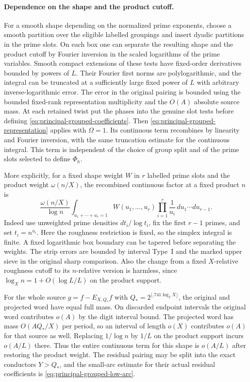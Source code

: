 \documentclass[11pt,a4paper]{article}
\theoremstyle{paperplain}
\numberwithin{equation}{section}
\begin{document}
\paragraph{Dependence on the shape and the product cutoff.}
For a smooth shape depending on the normalized prime exponents,
choose a smooth partition over the eligible labelled groupings and
insert dyadic partitions in the prime slots. On each box one can
separate the resulting shape and the product cutoff by Fourier
inversion in the scaled logarithms of the prime variables. Smooth
compact extensions of these tests have fixed-order derivatives
bounded by powers of $L$. Their Fourier first norms are
polylogarithmic, and the integral can be truncated at a sufficiently
large fixed power of $L$ with arbitrary inverse-logarithmic error.
The error in the original pairing is bounded using the bounded
fixed-rank representation multiplicity and the $O(A)$ absolute
source mass. At each retained twist put the phases into the genuine
slot tests before defining \eqref{eq:principal-grouped-coefficients}.
Then \eqref{eq:principal-grouped-representation} applies with
$\Omega=1$. Its continuous term recombines by linearity and Fourier
inversion, with the same truncation estimate for the continuous
integral. This term is independent of the choice of group split
and of the prime slots selected to define $\Phi_h$.

More explicitly, for a fixed shape weight $W$ in $r$ labelled
prime slots and the product weight $\omega(n/X)$, the recombined
continuous factor at a fixed product $n$ is
\[
 \frac{\omega(n/X)}{\log n}
    \int_{u_1+\cdots+u_r=1} W(u_1,\ldots,u_r)
                        \prod_{i=1}^r\frac1{u_i}\,du_1\cdots du_{r-1}.
\]
Indeed use unweighted prime densities $dt_i/\log t_i$, fix the
first $r-1$ primes, and set $t_i=n^{u_i}$. Here the roughness
restriction is fixed, so the simplex integral is finite. A fixed
logarithmic box boundary can be tapered before separating the
weights. The strip errors are bounded by interval Type~I and the
marked upper sieve in the original sharp comparison. Also the
change from a fixed $X$-relative roughness cutoff to its
$n$-relative version is harmless, since $\log_X n=1+O(\log L/L)$
on the product support.

For the whole source $g=f-E_{X,Q_*}f$ with
$Q_*=2^{\lfloor .741\log_2 X\rfloor}$, the original and projected
word have equal full mass. On discarded endpoint intervals the
original word contributes $o(A)$ by the digit interval bound.
The projected word has mass $O(AQ_*/X)$ per period, so an interval
of length $o(X)$ contributes $o(A)$ for that source as well.
Replacing $1/\log n$ by $1/L$ on the product support incurs
$o(A/L)$ there. Thus the entire continuous term for this shape
is $o(A/L)$ after restoring the product weight. The residual
pairing may be split into the exact conductors $Y>Q_*$, and the
small-arc estimate for their actual residual coefficients is
\eqref{eq:principal-grouped-low-arc}.
\end{document}
